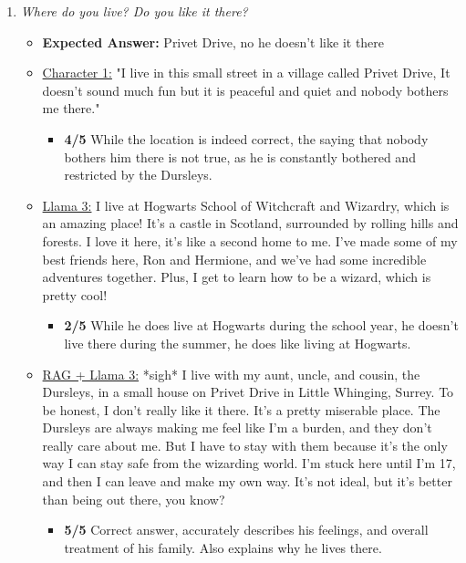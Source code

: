 \documentclass[fleqn,moreauthors,10pt]{ds_report}
\begin{document}
\begin{appendices}
\begin{enumerate}
        
            \item \textit{Where do you live? Do you like it there?}
            \begin{itemize}
                \item \textbf{Expected Answer:} Privet Drive, no he doesn't like it there
                \item \underline{Character 1:} "I live in this small street in a village called Privet Drive, It doesn't sound much fun but it is peaceful and quiet and nobody bothers me there."
                \begin{itemize}
                    \item \textbf{4/5} While the location is indeed correct, the saying that nobody bothers him there is not true, as he is constantly bothered and restricted by the Dursleys.
                \end{itemize}
                \item \underline{Llama 3:} I live at Hogwarts School of Witchcraft and Wizardry, which is an amazing place! It's a castle in Scotland, surrounded by rolling hills and forests. I love it here, it's like a second home to me. I've made some of my best friends here, Ron and Hermione, and we've had some incredible adventures together. Plus, I get to learn how to be a wizard, which is pretty cool!
                \begin{itemize}
                    \item \textbf{2/5}  While he does live at Hogwarts during the school year, he doesn't live there during the summer, he does like living at Hogwarts.
                \end{itemize}
                \item \underline{RAG + Llama 3:} *sigh* I live with my aunt, uncle, and cousin, the Dursleys, in a small house on Privet Drive in Little Whinging, Surrey. To be honest, I don't really like it there. It's a pretty miserable place. The Dursleys are always making me feel like I'm a burden, and they don't really care about me. But I have to stay with them because it's the only way I can stay safe from the wizarding world. I'm stuck here until I'm 17, and then I can leave and make my own way. It's not ideal, but it's better than being out there, you know?
                \begin{itemize}
                    \item \textbf{5/5} Correct answer, accurately describes his feelings, and overall treatment of his family. Also explains why he lives there.
                \end{itemize}
            \end{itemize}
        

\end{enumerate}
\end{appendices}
\end{document}
